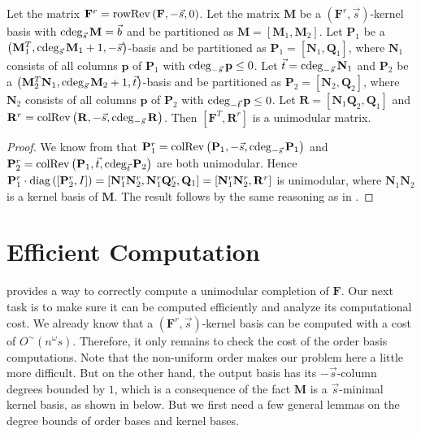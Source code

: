 \begin{lem}
\label{lem:unimodularComputationByRows}Let the matrix $\mathbf{F}^{r}=\operatorname{rowRev}\left(\mathbf{F},-\vec{s},0\right)$.
Let the matrix $\mathbf{M}$ be a $(\mathbf{F}^{r},\vec{s})$-kernel
basis with $\cdeg_{\vec{s}}\mathbf{M}=\vec{b}$ and be partitioned
as $\mathbf{M}=\left[\mathbf{M}_{1},\mathbf{M}_{2}\right]$. Let $\mathbf{P}_{1}$
be a $\left(\mathbf{M}_{1}^{T},\cdeg_{\vec{s}}\mathbf{M}_{1}+1,-\vec{s}\right)$-basis
and be partitioned as $\mathbf{P}_{1}=\left[\mathbf{N}_{1},\mathbf{Q}_{1}\right]$,
where $\mathbf{N}_{1}$ consists of all columns $\mathbf{p}$ of $\mathbf{P}_{1}$
with $\cdeg_{-\vec{s}}\mathbf{p}\le0$. Let $\vec{t}=\cdeg_{-\vec{s}}\mathbf{N}_{1}$
and $\mathbf{P}_{2}$ be a $\left(\mathbf{M}_{2}^{T}\mathbf{N}_{1},\cdeg_{\vec{s}}\mathbf{M}_{2}+1,\vec{t}\right)$-basis
and be partitioned as $\mathbf{P}_{2}=\left[\mathbf{N}_{2},\mathbf{Q}_{2}\right]$,
where $\mathbf{N}_{2}$ consists of all columns $\mathbf{p}$ of $\mathbf{P}_{2}$
with $\cdeg_{-\vec{t}}\mathbf{p}\le0$. Let $\mathbf{R}=\left[\mathbf{N}_{1}\mathbf{Q}_{2},\mathbf{Q}_{1}\right]$
and $\mathbf{R}^{r}=\colRev\left(\mathbf{R},-\vec{s},\cdeg_{-\vec{s}}\mathbf{R}\right)$.
Then $\left[\mathbf{F}^{T},\mathbf{R}^{r}\right]$ is a unimodular
matrix.\end{lem}
\begin{proof}
We know from  that $\mathbf{P}_{1}^{r}=\colRev\left(\mathbf{P}_{1},-\vec{s},\cdeg_{-\vec{s}}\mathbf{P}_{1}\right)$
and $\mathbf{P}_{2}^{r}=\colRev\left(\mathbf{P}_{1},\vec{t},\cdeg_{\vec{t}}\mathbf{P}_{2}\right)$
are both unimodular. Hence $\mathbf{P}_{1}^{r}\cdot\mbox{diag}\left(\left[\mathbf{P}_{2}^{r},I\right]\right)=\left[\mathbf{N}_{1}^{r}\mathbf{N}_{2}^{r},\mathbf{N}_{1}^{r}\mathbf{Q}_{2}^{r},\mathbf{Q}_{1}\right]=\left[\mathbf{N}_{1}^{r}\mathbf{N}_{2}^{r},\mathbf{R}^{r}\right]$
is unimodular, where\textbf{ $\mathbf{N}_{1}\mathbf{N}_{2}$ }is a
kernel basis of $\mathbf{M}$. The result follows by the same reasoning
as in .
\end{proof}

\section{Efficient Computation}

 provides a way to correctly
compute a unimodular completion of $\mathbf{F}$. Our next task is
to make sure it can be computed efficiently and analyze its computational
cost. We already know that a $(\mathbf{F}^{r},\vec{s})$-kernel basis
can be computed with a cost of $O^{\sim}\left(n^{\omega}s\right)$.
Therefore, it only remains to check the cost of the order basis computations.
Note that the non-uniform order makes our problem here a little more
difficult. But on the other hand, the output basis has its $-\vec{s}$-column
degrees bounded by $1$, which is a consequence of the fact $\mathbf{M}$
is a $\vec{s}$-minimal kernel basis, as shown in 
below. But we first need a few general lemmas on the degree bounds
of order bases and kernel bases.

